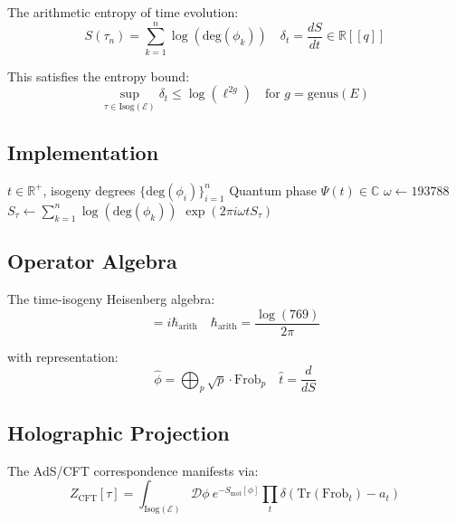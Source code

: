 \documentclass[12pt]{article}
\begin{document}
\begin{definition}
The arithmetic entropy of time evolution:
\begin{equation}
    S(\tau_n) = \sum_{k=1}^n \log(\text{deg}(\phi_k)) \quad \delta_t = \frac{dS}{dt} \in \mathbb{R}[[q]]
\end{equation}
\end{definition}

This satisfies the entropy bound:
\begin{equation}
    \sup_{\tau \in \text{Isog}(\mathcal{E})} \delta_t \leq \log(\ell^{2g}) \quad \text{for } g=\text{genus}(E)
\end{equation}

\subsection{Implementation}

\begin{algorithm}[H]
\caption{Frobenioid Quantum Clock}
\begin{algorithmic}[1]
\Require $t\in\mathbb{R}^+$, isogeny degrees $\{\text{deg}(\phi_i)\}_{i=1}^n$
\Ensure Quantum phase $\Psi(t) \in \mathbb{C}$
\State $\omega \gets 193788$
\State $S_\tau \gets \sum_{k=1}^n \log(\text{deg}(\phi_k))$
\State \Return $\exp(2\pi i \omega t S_\tau)$
\end{algorithmic}
\end{algorithm}

\subsection{Operator Algebra}

The time-isogeny Heisenberg algebra:
\begin{equation}
    [\hat{t}, \hat{\phi}] = i\hbar_{\text{arith}} \quad \hbar_{\text{arith}} = \frac{\log(769)}{2\pi}
\end{equation}

with representation:
\begin{equation}
    \hat{\phi} = \bigoplus_p \sqrt{p} \cdot \text{Frob}_p \quad \hat{t} = \frac{d}{dS}
\end{equation}

\subsection{Holographic Projection}

The AdS/CFT correspondence manifests via:
\begin{equation}
    Z_{\text{CFT}}[\tau] = \int_{\text{Isog}(\mathcal{E})} \mathcal{D}\phi \ e^{-S_{\text{mot}}[\phi]} \prod_t \delta(\text{Tr}(\text{Frob}_t) - a_t)
\end{equation}
\end{document}
